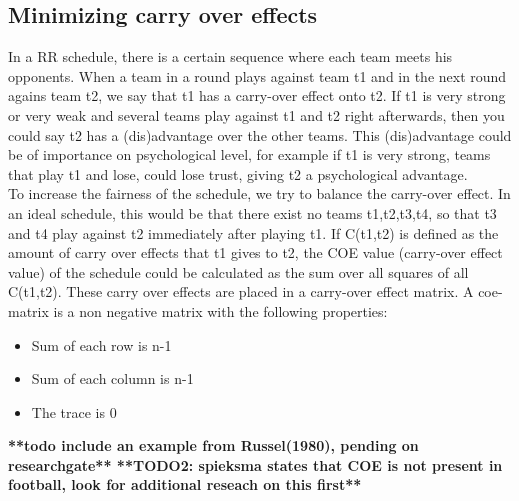\subsection{Minimizing carry over effects}
In a RR schedule, there is a certain sequence where each team meets his opponents. When a team in a round plays against team t1 and in the next round agains team t2, we say that t1 has a carry-over effect onto t2. If t1 is very strong or very weak and several teams play against t1 and t2 right afterwards, then you could say t2 has a (dis)advantage over the other teams. This (dis)advantage could be of importance on psychological level, for example if t1 is very strong, teams that play t1 and lose, could lose trust, giving t2 a psychological advantage. 
\\[5px]
To increase the fairness of the schedule, we try to balance the carry-over effect. In an ideal schedule, this would be that there exist no teams t1,t2,t3,t4, so that t3 and t4 play against t2 immediately after playing t1. If C(t1,t2) is defined as the amount of carry over effects that t1 gives to t2, the COE value (carry-over effect value) of the schedule could be calculated as the sum over all squares of all C(t1,t2). These carry over effects are placed in a carry-over effect matrix. A coe-matrix is a non negative matrix with the following properties: 
\begin{itemize}
\item{Sum of each row is n-1}
\item{Sum of each column is n-1}
\item{The trace is 0}
\end{itemize}
\textbf{**todo include an example from Russel(1980), pending on researchgate**
**TODO2: spieksma states that COE is not present in football, look for additional reseach on this first**}

